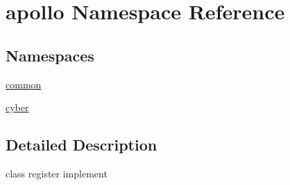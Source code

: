 \hypertarget{namespaceapollo}{\section{apollo Namespace Reference}
\label{namespaceapollo}
}
\subsection*{Namespaces}
\begin{DoxyCompactItemize}
\item 
\hyperlink{namespaceapollo_1_1common}{common}
\item 
\hyperlink{namespaceapollo_1_1cyber}{cyber}
\end{DoxyCompactItemize}


\subsection{Detailed Description}
class register implement 